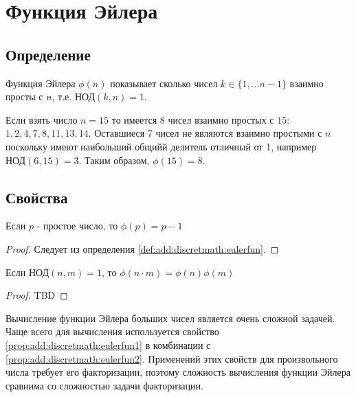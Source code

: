 \section{Функция Эйлера}

\subsection{Определение}
\begin{definition}
Функция Эйлера $\phi\left(n\right)$ показывает сколько чисел $k \in
\{1, ... n-1\}$ взаимно просты с $n$, т.е. $\mbox{НОД}\left(k,
n\right) = 1$.
\label{def:add:discretmath:eulerfun}
\end{definition}

\begin{example}
  Если взять число $n=15$ то имеется 8 чисел взаимно простых с $15$: 
  $1, 2, 4, 7, 8, 11, 13, 14$. Оставшиеся 7 чисел не являются взаимно
  простыми с $n$ поскольку имеют наибольший общийй делитель отличный
  от 1, например $\mbox{НОД}\left(6, 15\right) = 3$.
  Таким образом, $\phi\left(15\right) = 8$. 
\end{example}

\subsection{Свойства}

\begin{property}
Если $p$ - простое число, то $\phi(p) = p - 1$
\begin{proof}
Следует из определения \ref{def:add:discretmath:eulerfun}.
\end{proof}
\label{prop:add:discretmath:eulerfun1}
\end{property}


\begin{property}
Если $\mbox{НОД}\left(n, m\right) = 1$, то
$\phi\left(n \cdot m\right) = \phi\left(n\right) \phi\left( m\right)$
\begin{proof}
TBD
\end{proof}
\label{prop:add:discretmath:eulerfun2}
\end{property}

\begin{remark}
\label{rem:add:discretmath:eulerfuncomplex}
Вычисление функции Эйлера больших чисел является очень сложной
задачей. Чаще всего для вычисления используется свойство
\ref{prop:add:discretmath:eulerfun1} в комбинации с
\ref{prop:add:discretmath:eulerfun2}. Применений этих свойств для
произвольного числа требует его факторизации, поэтому сложность
вычисления функции Эйлера сравнима со сложностью задачи факторизации. 
\end{remark}
